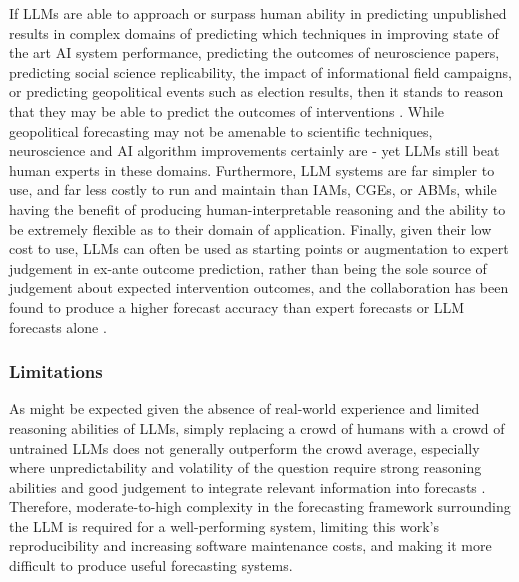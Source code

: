 \documentclass[12pt,a4paper]{article}
\begin{document}
If LLMs are able to approach or surpass human ability in predicting unpublished results in complex domains of predicting which techniques in improving state of the art AI system performance, predicting the outcomes of neuroscience papers, predicting social science replicability, the impact of informational field campaigns, or predicting geopolitical events such as election results, then it stands to reason that they may be able to predict the outcomes of interventions \ABSTRACT. While geopolitical forecasting may not be amenable to scientific techniques, neuroscience and AI algorithm improvements certainly are - yet LLMs still beat human experts in these domains. Furthermore, LLM systems are far simpler to use, and far less costly to run and maintain than IAMs, CGEs, or ABMs, while having the benefit of producing human-interpretable reasoning and the ability to be extremely flexible as to their domain of application. Finally, given their low cost to use, LLMs can often be used as starting points or augmentation to expert judgement in ex-ante outcome prediction, rather than being the sole source of judgement about expected intervention outcomes, and the collaboration has been found to produce a higher forecast accuracy than expert forecasts or LLM forecasts alone .

\subsubsection{Limitations}
\label{sub:limitations}
As might be expected given the absence of real-world experience and limited reasoning abilities of LLMs, simply replacing a crowd of humans with a crowd of untrained LLMs does not generally outperform the crowd average, especially where unpredictability and volatility of the question require strong reasoning abilities and good judgement to integrate relevant information into forecasts  . Therefore, moderate-to-high complexity in the forecasting framework surrounding the LLM is required for a well-performing system, limiting this work's reproducibility and increasing software maintenance costs, and making it more difficult to produce useful forecasting systems.
\end{document}
